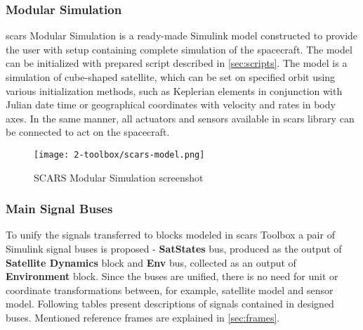     \subsubsection{Modular Simulation}
        \ac{scars} Modular Simulation is a ready-made Simulink model constructed to provide the user with setup containing complete simulation of the spacecraft. The model can be initialized with prepared script described in \autoref{sec:scripts}. The model is a simulation of cube-shaped satellite, which can be set on specified orbit using various initialization methods, such as Keplerian elements in conjunction with Julian date time or geographical coordinates with velocity and rates in body axes. In the same manner, all actuators and sensors available in \ac{scars} library can be connected to act on the spacecraft.

        \begin{figure}[H]
            \centering
            \texttt{[image: 2-toolbox/scars-model.png]}
            \caption{SCARS Modular Simulation screenshot}
            \label{fig:scars-model}
        \end{figure}


    \subsubsection{Main Signal Buses}\label{sec:buses}
        To unify the signals transferred to blocks modeled in \ac{scars} Toolbox a pair of Simulink signal buses is proposed - \textbf{SatStates} bus, produced as the output of \textbf{Satellite Dynamics} block and \textbf{Env} bus, collected as an output of \textbf{Environment} block. Since the buses are unified, there is no need for unit or coordinate transformations between, for example, satellite model and sensor model. Following tables present descriptions of signals contained in designed buses. Mentioned reference frames are explained in \autoref{sec:frames}. 

